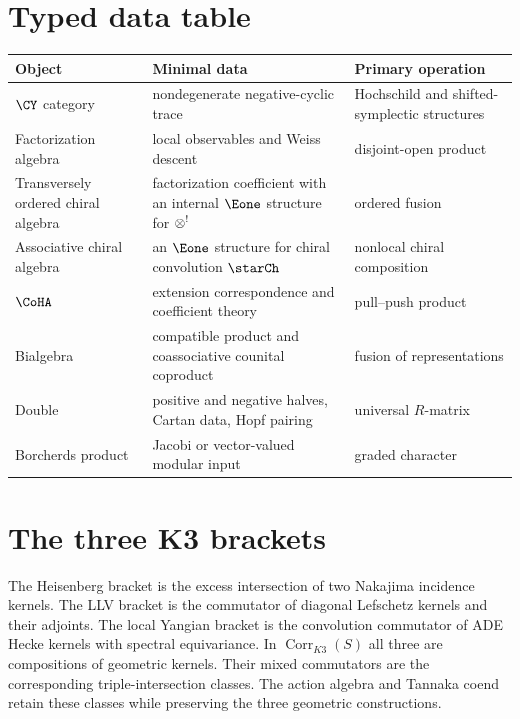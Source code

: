 \chapter{Typed data table}
\begin{center}
\small
\begin{tabularx}{0.98\textwidth}{@{}>{\raggedright\arraybackslash}p{}>{\raggedright\arraybackslash}X>{\raggedright\arraybackslash}p{}@{}}
\toprule
\textbf{Object}&\textbf{Minimal data}&\textbf{Primary operation}\\
\midrule
$\CY$ category&nondegenerate negative-cyclic trace&Hochschild and shifted-symplectic structures\\
Factorization algebra&local observables and Weiss descent&disjoint-open product\\
Transversely ordered chiral algebra&factorization coefficient with an internal $\Eone$ structure for $\mathbin{\otimes}^!$&ordered fusion\\
Associative chiral algebra&an $\Eone$ structure for chiral convolution $\starCh$&nonlocal chiral composition\\
$\CoHA$&extension correspondence and coefficient theory&pull--push product\\
Bialgebra&compatible product and coassociative counital coproduct&fusion of representations\\
Double&positive and negative halves, Cartan data, Hopf pairing&universal $R$-matrix\\
Borcherds product&Jacobi or vector-valued modular input&graded character\\
\bottomrule
\end{tabularx}
\end{center}

\chapter{The three K3 brackets}
The Heisenberg bracket is the excess intersection of two Nakajima incidence kernels.  The LLV bracket is the commutator of diagonal Lefschetz kernels and their adjoints.  The local Yangian bracket is the convolution commutator of ADE Hecke kernels with spectral equivariance.  In $\operatorname{Corr}_{K3}(S)$ all three are compositions of geometric kernels.  Their mixed commutators are the corresponding triple-intersection classes.  The action algebra and Tannaka coend retain these classes while preserving the three geometric constructions.

